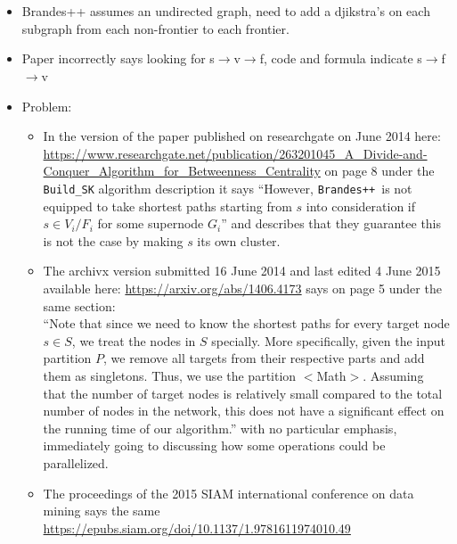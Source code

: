 \documentclass[a4paper,12pt,english]{article}
\newcommand{\printdatetitle}[1]{
      \texorpdfstring{\printdate{#1}}{#1}
    }
\begin{document}
\section*{\printdatetitle{2021/01/02}}
\begin{itemize}
\item Brandes++ assumes an undirected graph, need to add a djikstra's on each subgraph from each non-frontier to each frontier.
\item Paper incorrectly says looking for s$\rightarrow$v$\rightarrow$f, code and formula indicate s$\rightarrow$f$\rightarrow$v

\item Problem:
\begin{itemize}
\item In the version of the paper published on researchgate on June 2014 here: \url{https://www.researchgate.net/publication/263201045_A_Divide-and-Conquer_Algorithm_for_Betweenness_Centrality} on page 8 under the \texttt{Build\_SK} algorithm description it says ``However, \texttt{Brandes++ }is not equipped to take shortest paths starting from $s$ into consideration if $s\in V_i / F_i$ for some supernode $G_i$'' and describes that they guarantee this is not the case by making $s$ its own cluster.

\item The archivx version submitted 16 June 2014 and last edited 4 June 2015 available here:  \url{https://arxiv.org/abs/1406.4173} says on page 5 under the same section:\\

``Note  that  since we  need  to  know  the  shortest  paths  for  every  target node $s\in S$,  we  treat  the  nodes  in $S$ specially.   More specifically, given the input partition $P$, we remove all targets  from  their  respective  parts  and  add  them  as singletons.  Thus, we use the partition $<$Math$>$.  Assuming that the number of target  nodes  is  relatively  small  compared  to  the  total number of nodes in the network,  this does not have a significant effect on the running time of our algorithm.'' with no particular emphasis, immediately going to discussing how some operations could be parallelized.

\item The proceedings of the 2015 SIAM international conference on data mining says the same \url{https://epubs.siam.org/doi/10.1137/1.9781611974010.49}

\end{itemize}
\end{itemize}
\end{document}
